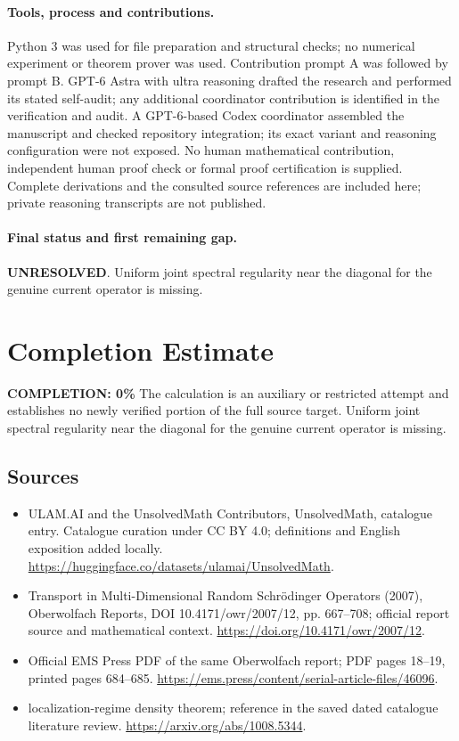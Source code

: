 \documentclass[11pt]{article}
\begin{document}
\paragraph{Tools, process and contributions.}
Python 3 was used for file preparation and structural checks; no numerical experiment or theorem prover was used. Contribution prompt A was followed by prompt B. GPT-6 Astra with ultra reasoning drafted the research and performed its stated self-audit; any additional coordinator contribution is identified in the verification and audit. A GPT-6-based Codex coordinator assembled the manuscript and checked repository integration; its exact variant and reasoning configuration were not exposed. No human mathematical contribution, independent human proof check or formal proof certification is supplied. Complete derivations and the consulted source references are included here; private reasoning transcripts are not published.

\paragraph{Final status and first remaining gap.}
\textbf{UNRESOLVED}. Uniform joint spectral regularity near the diagonal for the genuine current operator is missing.

\section{Completion Estimate}
\noindent\textbf{COMPLETION: 0\%}
The calculation is an auxiliary or restricted attempt and establishes no newly verified portion of the full source target. Uniform joint spectral regularity near the diagonal for the genuine current operator is missing.

\subsection{Sources}
\begin{itemize}
\item[\hypertarget{source:statement:1}{S1}] ULAM.AI and the UnsolvedMath Contributors, UnsolvedMath, catalogue entry. Catalogue curation under CC BY 4.0; definitions and English exposition added locally.
\url{https://huggingface.co/datasets/ulamai/UnsolvedMath}.
\item[\hypertarget{source:statement:2}{S2}] Transport in Multi-Dimensional Random Schrödinger Operators (2007), Oberwolfach Reports, DOI 10.4171/owr/2007/12, pp. 667--708; official report source and mathematical context.
\url{https://doi.org/10.4171/owr/2007/12}.
\item[\hypertarget{source:statement:3}{S3}] Official EMS Press PDF of the same Oberwolfach report; PDF pages 18--19, printed pages 684--685.
\url{https://ems.press/content/serial-article-files/46096}.
\item[\hypertarget{source:statement:4}{S4}] localization-regime density theorem; reference in the saved dated catalogue literature review.
\url{https://arxiv.org/abs/1008.5344}.
\end{itemize}
\label{end:statement}
\end{document}
